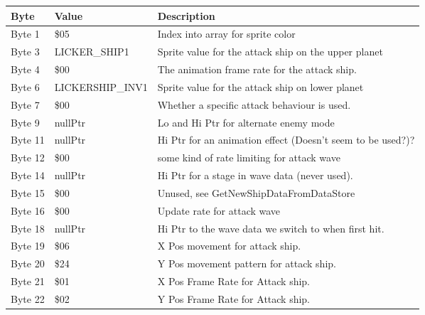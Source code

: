 \begin{figure}[H]
{\begin{adjustbox}{width=12cm}
\begin{tabular}{lll}
\toprule
 Byte    & Value                     & Description                                                        \\
\midrule
 Byte 1  & \$05                       & Index into array for sprite color                                  \\
 Byte 3  & LICKER\_SHIP1              & Sprite value for the attack ship on the upper planet               \\
 Byte 4  & \$00                       & The animation frame rate for the attack ship.                      \\
 Byte 6  & LICKERSHIP\_INV1           & Sprite value for the attack ship on lower planet                   \\
 Byte 7  & \$00                       & Whether a specific attack behaviour is used.                       \\
 Byte 9  & nullPtr                   & Lo and Hi Ptr for alternate enemy mode                             \\
 Byte 11 & nullPtr                   & Hi Ptr for an animation effect (Doesn't seem to be used?)?         \\
 Byte 12 & \$00                       & some kind of rate limiting for attack wave                         \\
 Byte 14 & nullPtr                   & Hi Ptr for a stage in wave data (never used).                      \\
 Byte 15 & \$00                       & Unused, see GetNewShipDataFromDataStore                            \\
 Byte 16 & \$00                       & Update rate for attack wave                                        \\
 Byte 18 & nullPtr                   & Hi Ptr to the wave data we switch to when first hit.               \\
 Byte 19 & \$06                       & X Pos movement for attack ship.                                    \\
 Byte 20 & \$24                       & Y Pos movement pattern for attack ship.                            \\
 Byte 21 & \$01                       & X Pos Frame Rate for Attack ship.                                  \\
 Byte 22 & \$02                       & Y Pos Frame Rate for Attack ship.                                  \\

\end{tabular}
\end{adjustbox}}
\end{figure}
